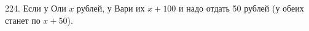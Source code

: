 224. Если у Оли $x$ рублей, у Вари их $x+100$ и надо отдать 50 рублей (у обеих станет по $x+50$).\\

